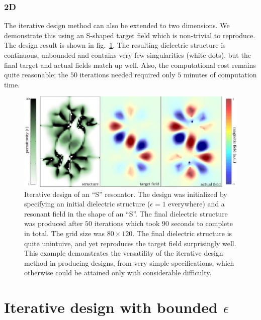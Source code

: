 \subsection{2D}
The iterative design method can also be extended to two dimensions\cite{Lu10}.
We demonstrate this using an S-shaped target field 
    which is non-trivial to reproduce. 
The design result is shown in fig.~\ref{S pic}. 
    The resulting dielectric structure is continuous, unbounded and 
    contains very few singularities (white dots), 
    but the final target and actual fields match up well. 
Also, the computational cost remains quite reasonable; the $50$ iterations needed required only $5$ minutes of computation time. 
\begin{figure}\centering
\includegraphics[width=\textwidth]{p1/S}
\caption{Iterative design of an ``S'' resonator. 
The design was initialized by specifying an initial dielectric structure ($\epsilon=1$ everywhere) and a resonant field in the shape of an ``S''. 
The final dielectric structure was produced after $50$ iterations which took $90$ seconds to complete in total. The grid size was $80\times 120$. The final dielectric structure is quite unintuive, and yet reproduces the target field surprisingly well. This example demonstrates the versatility of the iterative design method in producing designs, from very simple specifications, which otherwise could be attained only with considerable difficulty.}
\label{S pic}
\end{figure}

\chapter{Iterative design with bounded $\epsilon$} \label{bounded}
